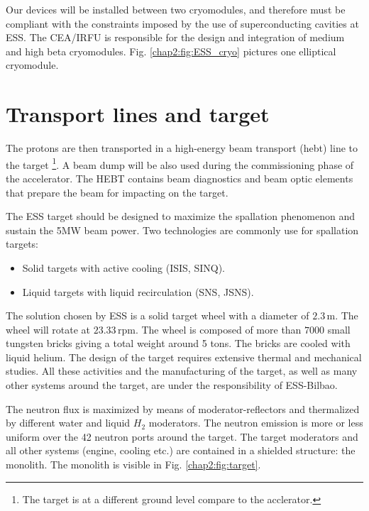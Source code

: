 \begin{refsection}
  Our devices will be installed between two cryomodules, and therefore must be compliant with the constraints imposed by the use of superconducting cavities at ESS. The CEA/IRFU is responsible for the design and integration of medium and high beta cryomodules. Fig. \ref{chap2:fig:ESS_cryo} pictures one elliptical cryomodule.

  

  \section{Transport lines and target}
  The protons are then transported in a high-energy beam transport (\acrshort{hebt}) line to the target \footnote{The target is at a different ground level compare to the acclerator.}. A beam dump will be also used during the commissioning phase of the accelerator. The HEBT contains beam diagnostics and beam optic elements that prepare the beam for impacting on the target.

  The ESS target should be designed to maximize the spallation phenomenon and sustain the 5MW beam power. Two technologies are commonly use for spallation targets:
  \begin{itemize}
    \item Solid targets with active cooling (ISIS, SINQ).
    \item Liquid targets with liquid recirculation (SNS, JSNS).
  \end{itemize}
  The solution chosen by ESS is a solid target wheel with a diameter of $2.3\,\mathrm{m}$. The wheel will rotate at $23.33\,\mathrm{rpm}$. The wheel is composed of more than $7000$ small tungsten bricks giving a total weight around 5 tons. The bricks are cooled with liquid helium. The design of the target requires extensive thermal and mechanical studies. All these activities and the manufacturing of the target, as well as many other systems around the target, are under the responsibility of ESS-Bilbao.

  The neutron flux is maximized by means of moderator-reflectors and thermalized by different water and liquid $H_{2}$ moderators. The neutron emission is more or less uniform over the 42 neutron ports around the target. The target moderators and all other systems (engine, cooling etc.) are contained in a shielded structure: the monolith. The monolith is visible in Fig. \ref{chap2:fig:target}.

  


\end{refsection}
